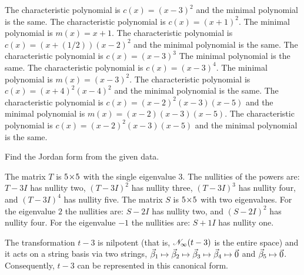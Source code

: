 \begin{exercises}
    \begin{answer}
      \begin{exparts}
        \partsitem The characteristic polynomial is $c(x)=(x-3)^2$ and
          the minimal polynomial is the same.
        \partsitem The characteristic polynomial is $c(x)=(x+1)^2$.
          The minimal polynomial is $m(x)=x+1$.
        \partsitem The characteristic polynomial is 
          $c(x)=(x+(1/2))(x-2)^2$ and
          the minimal polynomial is the same.
        \partsitem The characteristic polynomial is $c(x)=(x-3)^3$
          The minimal polynomial is the same.
        \partsitem The characteristic polynomial is $c(x)=(x-3)^4$.
          The minimal polynomial is $m(x)=(x-3)^2$.
        \partsitem The characteristic polynomial is $c(x)=(x+4)^2(x-4)^2$ and
          the minimal polynomial is the same.
        \partsitem The characteristic polynomial is 
          $c(x)=(x-2)^2(x-3)(x-5)$ and
          the minimal polynomial is $m(x)=(x-2)(x-3)(x-5)$.
        \partsitem The characteristic polynomial is 
          $c(x)=(x-2)^2(x-3)(x-5)$ and
          the minimal polynomial is the same.
      \end{exparts}
    \end{answer}
  \recommended \item
    Find the Jordan form from the given data.
    \begin{exparts}
       \partsitem The matrix 
         \( T \) is \( 5 \! \times \! 5 \) with the single eigenvalue $3$.
         The nullities of the powers are:
         \( T-3I \) has nullity two, \( (T-3I)^2 \) has nullity three,
         \( (T-3I)^3 \) has nullity four, and \( (T-3I)^4 \) has nullity
         five.
       \partsitem The matrix \( S \) is \( 5 \! \times \! 5 \) with two eigenvalues.
         For the eigenvalue $2$ the nullities are:
         \( S-2I \) has nullity two, and \( (S-2I)^2 \) has nullity four.
         For the eigenvalue $-1$ the nullities are:
         \( S+1I \) has nullity one.
    \end{exparts}
    \begin{answer}
      \begin{exparts}
         \partsitem The transformation $t-3$ is nilpotent 
          (that is, $\mathscr{N}_\infty(t-3)$ is the entire space)
          and it acts on a string basis via two strings, 
          $\vec{\beta}_1\mapsto\vec{\beta}_2\mapsto\vec{\beta}_3
            \mapsto\vec{\beta}_4\mapsto\vec{0}$
          and $\vec{\beta}_5\mapsto\vec{0}$.
          Consequently, $t-3$ can be represented in this canonical form.
          \begin{equation*}

\end{equation*}
\end{exparts}
\end{answer}
\end{exercises}
